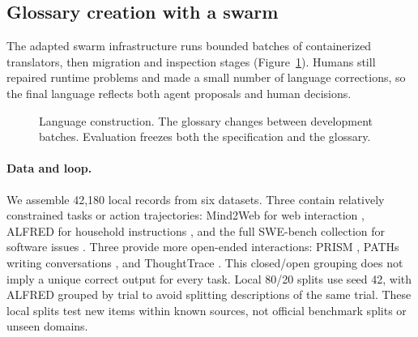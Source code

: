 \documentclass[11pt]{article}
\begin{document}
\subsection{Glossary creation with a swarm}
The adapted swarm infrastructure runs bounded batches of containerized translators, then migration and inspection stages (Figure~\ref{fig:pipeline}). Humans still repaired runtime problems and made a small number of language corrections, so the final language reflects both agent proposals and human decisions.

\begin{figure}[t]
\centering
{}
\caption{Language construction. The glossary changes between development batches. Evaluation freezes both the specification and the glossary.}
\label{fig:pipeline}
\end{figure}

\paragraph{Data and loop.}
We assemble 42,180 local records from six datasets. Three contain relatively constrained tasks or action trajectories: Mind2Web for web interaction \citep{deng2023mind2web}, ALFRED for household instructions \citep{shridhar2020alfred}, and the full SWE-bench collection for software issues \citep{jimenez2024swebench}. Three provide more open-ended interactions: PRISM \citep{kirk2024prism}, PATHs writing conversations \citep{mysore2025paths}, and ThoughtTrace \citep{jin2026thoughttrace}. This closed/open grouping does not imply a unique correct output for every task. Local 80/20 splits use seed 42, with ALFRED grouped by trial to avoid splitting descriptions of the same trial. These local splits test new items within known sources, not official benchmark splits or unseen domains.
\end{document}
